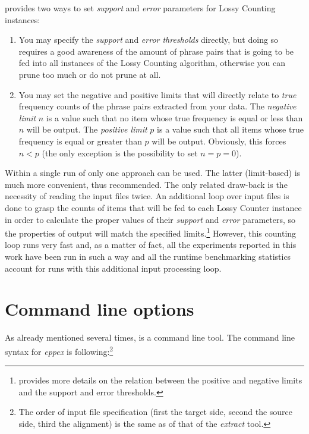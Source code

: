 \Eppex{} provides two ways to set \emph{support} and \emph{error} parameters
for Lossy Counting instances:
\begin{enumerate}
  \item You may specify the \emph{support} and \emph{error thresholds} directly, but doing so
    requires a good awareness of the amount of phrase pairs that is going to be fed into all
    instances of the Lossy Counting algorithm, otherwise you can prune too much or do not prune at all.
  \item You may set the negative and positive limits that will directly relate to \emph{true}
    frequency counts of the phrase pairs extracted from your data. The \emph{negative limit}
    $n$ is a value such that no item whose true frequency is equal or less than $n$ will be output.
    The \emph{positive limit} $p$ is a value such that all items whose true frequency is equal
    or greater than $p$ will be output. Obviously, this forces $n < p$ (the only exception
    is the possibility to set $n = p = 0$).
\end{enumerate}

Within a single run of \eppex{} only one approach can be used.
The latter (limit-based) is much more convenient, thus recommended.
The only related draw-back is the necessity of reading the input files twice.
An additional loop over input files is done to grasp the counts of items
that will be fed to each Lossy Counter instance in order to calculate
the proper values of their \emph{support} and \emph{error} parameters,
so the properties of output will match the specified limits.\footnote{
provides more details on the relation between the positive and negative limits and
the support and error thresholds.}
However, this counting loop runs very fast and, as a matter of fact, all the \eppex{}
experiments reported in this work have been run in such a way and all the runtime
benchmarking statistics account for runs with this additional input processing loop.

\section{Command line options}

As already mentioned several times, \eppex{} is a command line tool.
The command line syntax for \emph{eppex} is following:\footnote{The order
of input file specification (first the target side, second the source side, third the alignment)
is the same as of that of the \emph{extract} tool.}

